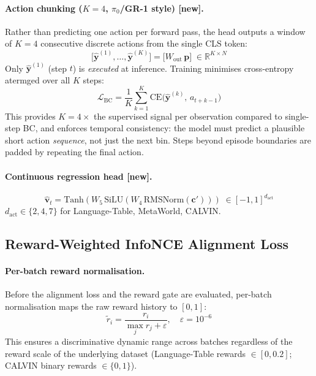 \documentclass{article}
\newcommand{\NEW}{\textcolor{NewOrange}{\textbf{[new]}}\xspace}
\begin{document}
\paragraph{Action chunking (\boldmath$K\!=\!4$, $\pi_0$/GR-1 style) \NEW.}
Rather than predicting one action per forward pass, the head outputs a
window of $K{=}4$ consecutive discrete actions from the single CLS token:
\begin{equation}
  \bigl[\hat{\mathbf{y}}^{(1)},\ldots,\hat{\mathbf{y}}^{(K)}\bigr]
  = \bigl[W_{\mathrm{out}}\,\mathbf{p}\bigr]
    \;\in\mathbb{R}^{K\times N}
  \label{eq:chunk_logits}
\end{equation}
Only $\hat{\mathbf{y}}^{(1)}$ (step $t$) is \emph{executed} at inference.
Training minimises cross-entropy atermged over all $K$ steps:
\begin{equation}
  \mathcal{L}_{\mathrm{BC}}
  = \frac{1}{K}\sum_{k=1}^{K}
    \mathrm{CE}\!\bigl(\hat{\mathbf{y}}^{(k)},\,a_{t+k-1}\bigr)
  \label{eq:chunk_ce}
\end{equation}
This provides $K\!=\!4\times$ the supervised signal per observation
compared to single-step BC, and enforces temporal consistency:
the model must predict a plausible short action \emph{sequence},
not just the next bin.
Steps beyond episode boundaries are padded by repeating the final action.

\paragraph{Continuous regression head \NEW.}
\begin{equation}
  \hat{\mathbf{v}}_t = \mathrm{Tanh}(W_5\,\mathrm{SiLU}(W_4\,\mathrm{RMSNorm}(\mathbf{c}')))
  \;\in[-1,1]^{d_{\mathrm{act}}}
\end{equation}
$d_{\mathrm{act}}\!\in\!\{2,4,7\}$ for Language-Table, MetaWorld, CALVIN.

\subsection{Reward-Weighted InfoNCE Alignment Loss}
\label{sec:alignment}

\paragraph{Per-batch reward normalisation.}
Before the alignment loss and the reward gate are evaluated, per-batch
normalisation maps the raw reward history to $[0,1]$:
\begin{equation}
  \tilde{r}_i = \frac{r_i}{\max_j r_j + \varepsilon}, \quad \varepsilon=10^{-6}
  \label{eq:batch_norm}
\end{equation}
This ensures a discriminative dynamic range across batches regardless of the
reward scale of the underlying dataset (Language-Table rewards $\in[0,0.2]$;
CALVIN binary rewards $\in\{0,1\}$).
\end{document}
